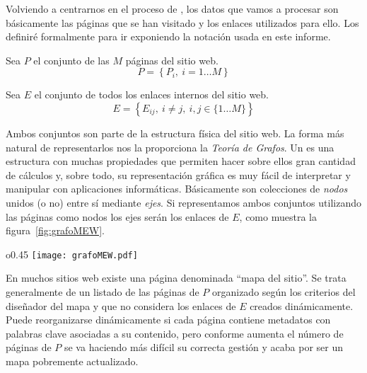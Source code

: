 Volviendo a centrarnos en el proceso de \WUM, los datos que vamos a procesar son básicamente las páginas que se han visitado y los enlaces utilizados para ello. Los definiré formalmente para ir exponiendo la notación usada en este informe.

\begin{Definition}\label{def:1-2-4-cjto-paginasSW}
   Sea $P$ el conjunto de las $M$ páginas del sitio web.
  \begin{equation}\label{eq:1-2-4-cjto-paginasSW}
    P = \left\{P_i,\ i=1\ldots M\right\}
  \end{equation}
\end{Definition}

\begin{Definition}\label{def:1-2-4-cjto-enlacesInternos}
   Sea $E$ el conjunto de todos los enlaces internos del sitio web.
  \begin{equation}\label{eq:1-2-4-cjto-enlacesSW}
    E = \left\{E_{ij},\ i\neq j,\ i,j\in\{1\ldots M\}\right\}
  \end{equation}
\end{Definition}

Ambos conjuntos son parte de la estructura física del sitio web. La forma más natural de representarlos nos la proporciona la \emph{Teoría de Grafos}. Un \grafo es una estructura con muchas propiedades que permiten hacer sobre ellos gran cantidad de cálculos y, sobre todo, su representación gráfica es muy fácil de interpretar y manipular con aplicaciones informáticas. Básicamente son colecciones de \emph{nodos} unidos (o no) entre sí mediante \emph{ejes}. Si representamos ambos conjuntos utilizando las páginas como nodos los ejes serán los enlaces de $E$, como muestra la figura~\ref{fig:grafoMEW}.

\begin{wrapfigure}{o}{0.45\textwidth}
  \centering
  \texttt{[image: grafoMEW.pdf]}
	\caption[Estructura del sitio web]{\small Estructura del sitio web}
	\label{fig:grafoMEW}
\end{wrapfigure}
En muchos sitios web existe una página denominada "`mapa del sitio"'. Se trata generalmente de un listado de las páginas de $P$ organizado según los criterios del diseñador del mapa y que no considera los enlaces de $E$ creados dinámicamente. Puede reorganizarse dinámicamente si cada página contiene metadatos con palabras clave asociadas a su contenido, pero conforme aumenta el número de páginas de $P$ se va haciendo más difícil su correcta gestión y acaba por ser un mapa pobremente actualizado.

